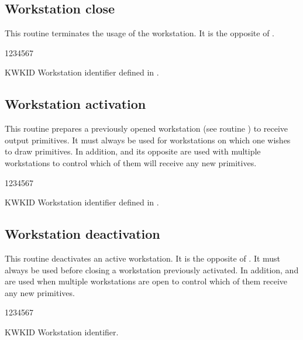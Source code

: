 \subsection{Workstation close}
\Action
This routine terminates the usage of the workstation. It is the opposite of
.
\Pdesc
\begin{DLtt}{1234567}
\item[KWKID] Workstation identifier defined in .
\end{DLtt}
%
\subsection{Workstation activation}
\Action
This routine prepares a previously opened workstation (see routine )
to receive output primitives. It must always be used for workstations on which
one wishes to draw primitives. In addition,  and its opposite
 are used with multiple workstations to control which of them will
receive any new primitives.
\Pdesc
\begin{DLtt}{1234567}
\item[KWKID] Workstation identifier defined in .
\end{DLtt}
%
\subsection{Workstation deactivation}
\Action
This routine deactivates an active workstation. It is the opposite of
. It must always be used before closing a workstation previously
activated. In addition,  and  are used when multiple
workstations are open to control which of them receive any new primitives.
\Pdesc
\begin{DLtt}{1234567}
\item[KWKID] Workstation identifier.
\end{DLtt}
%
